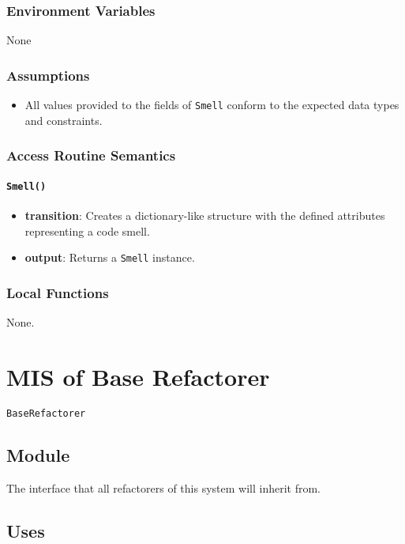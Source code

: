 \documentclass[12pt, titlepage]{article}
\begin{document}
\subsubsection{Environment Variables}
None

\subsubsection{Assumptions}
\begin{itemize}
  \item All values provided to the fields of \texttt{Smell} conform to the expected data types and constraints.
\end{itemize}

\subsubsection{Access Routine Semantics}

\paragraph{\texttt{Smell()}}
\begin{itemize}
  \item \textbf{transition}: Creates a dictionary-like structure with the defined attributes representing a code smell.
  \item \textbf{output}: Returns a \texttt{Smell} instance.
\end{itemize}

\subsubsection{Local Functions}
None.
  

\newpage

\section{MIS of Base Refactorer} \label{mis:baseR}

\texttt{BaseRefactorer}

\subsection{Module}

The interface that all refactorers of this system will inherit from.

\subsection{Uses}
\end{document}
